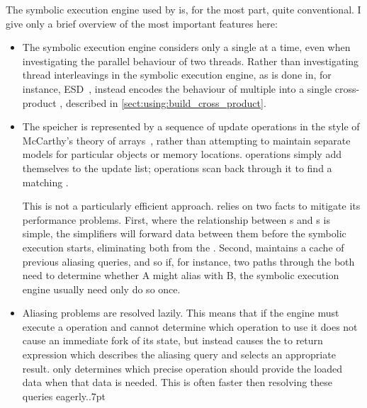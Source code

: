 The symbolic execution engine used by {\implementation} is, for the
most part, quite conventional.  I give only a brief overview of the
most important features here:
\begin{itemize}
\item The symbolic execution engine considers only a single
  {\StateMachine} at a time, even when investigating the parallel
  behaviour of two threads.  Rather than investigating thread
  interleavings in the symbolic execution engine, as is done in, for
  instance, ESD~\cite{Zamfir2010}, {\technique} instead encodes the
  behaviour of multiple {\StateMachines} into a single cross-product
  {\StateMachines}, described in
  \autoref{sect:using:build_cross_product}.

\item The {\StateMachine} speicher is represented by a sequence of
  update operations in the style of McCarthy's theory of
  arrays~\cite{McCarthy1962}, rather than attempting to maintain
  separate models for particular objects or memory locations.
   operations simply add themselves to the update list;
   operations scan back through it to find a matching
  .

  This is not a particularly efficient approach.  {\Implementation}
  relies on two facts to mitigate its performance problems.  First,
  where the relationship between s and s is
  simple, the {\StateMachine} simplifiers will forward data between
  them before the symbolic execution starts, eliminating both from the
  {\StateMachine}.  Second, {\implementation} maintains a cache of
  previous aliasing queries, and so if, for instance, two paths
  through the {\StateMachine} both need to determine whether
   A might alias with  B, the symbolic
  execution engine usually need only do so once.

\item Aliasing problems are resolved lazily.  This means that if the
  engine must execute a  operation and cannot determine
  which  operation to use it does not cause an immediate
  fork of its state, but instead causes the  to return
  {\AStateMachine} expression which describes the aliasing query and
  selects an appropriate result.  {\Implementation} only determines
  which precise  operation should provide the loaded data
  when that data is needed.  This is often faster then resolving these
  queries eagerly.\kern.7pt


\end{itemize}

